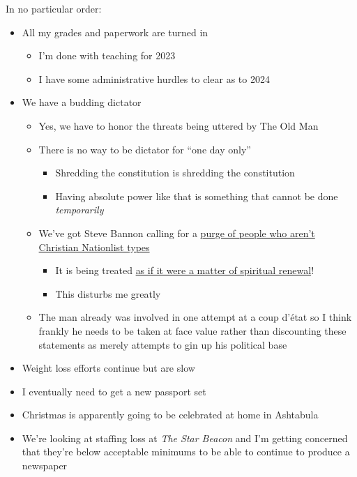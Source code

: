 In no particular order:

\begin{itemize}
\tightlist
\item
  All my grades and paperwork are turned in

  \begin{itemize}
  \tightlist
  \item
    I'm done with teaching for 2023
  \item
    I have some administrative hurdles to clear as to 2024
  \end{itemize}
\item
  We have a budding dictator

  \begin{itemize}
  \tightlist
  \item
    Yes, we have to honor the threats being uttered by The Old Man
  \item
    There is no way to be dictator for ``one day only''

    \begin{itemize}
    \tightlist
    \item
      Shredding the constitution is shredding the constitution
    \item
      Having absolute power like that is something that cannot be done
      \emph{temporarily}
    \end{itemize}
  \item
    We've got Steve Bannon calling for a
    \href{https://www.msn.com/en-us/news/opinion/steve-bannon-non-christian-nationalists-all-have-to-be-purged-in-trumps-second-term/ar-AA1kZkoL}{purge
    of people who aren't Christian Nationlist types}

    \begin{itemize}
    \tightlist
    \item
      It is being treated
      \href{https://www.msn.com/en-us/news/world/steve-bannon-calls-for-his-enemies-to-be-purged/ar-AA1l5MAx}{as
      if it were a matter of spiritual renewal}!
    \item
      This disturbs me greatly
    \end{itemize}
  \item
    The man already was involved in one attempt at a coup d'état so I
    think frankly he needs to be taken at face value rather than
    discounting these statements as merely attempts to gin up his
    political base
  \end{itemize}
\item
  Weight loss efforts continue but are slow
\item
  I eventually need to get a new passport set
\item
  Christmas is apparently going to be celebrated at home in Ashtabula
\item
  We're looking at staffing loss at \emph{The Star Beacon} and I'm
  getting concerned that they're below acceptable minimums to be able to
  continue to produce a newspaper


\end{itemize}
